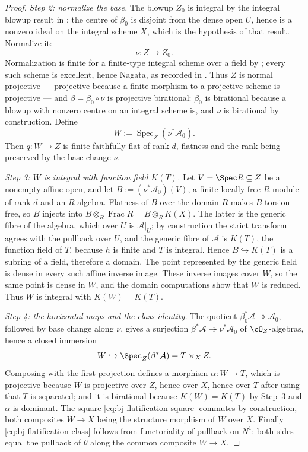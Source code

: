\begin{proof}
\emph{Step 2: normalize the base.}
The blowup $Z_0$ is integral by the integral blowup result in
\cite[\href{https://stacks.math.columbia.edu/tag/01OF}{Tag 01OF}]
{stacks-project}; the centre of $\beta_0$ is disjoint from the dense open
$U$, hence is a nonzero ideal on the integral scheme $X$, which is the
hypothesis of that result.  Normalize it:
\[
                         \nu:Z\longrightarrow Z_0.
\]
Normalization is finite for a finite-type integral scheme over a field by
\cite[\href{https://stacks.math.columbia.edu/tag/035S}{Tag 035S}]
{stacks-project}; every such scheme is excellent, hence Nagata, as recorded
in .
Thus $Z$ is normal projective --- projective because a finite morphism to
a projective scheme is projective --- and
$\beta=\beta_0\circ\nu$ is projective birational: $\beta_0$ is birational
because a blowup with nonzero centre on an integral scheme is, and $\nu$
is birational by construction.  Define
\[
                         W:=\operatorname{Spec}_Z(\nu^*\mathcal A_0).
\tag{41.14}\label{eq:bj-flatification-W}
\]
Then $q:W\to Z$ is finite faithfully flat of rank $d$, flatness and the
rank being preserved by the base change $\nu$.

\emph{Step 3: $W$ is integral with function field $K(T)$.}
Let $V=\Spec R\subseteq Z$ be a nonempty affine open, and let
$B:=(\nu^*\mathcal A_0)(V)$, a finite locally free $R$-module of rank $d$ and an
$R$-algebra.  Flatness of $B$ over the domain $R$ makes $B$
torsion free, so $B$ injects into
$B\otimes_R\operatorname{Frac}R=B\otimes_R K(X)$.  The latter is the
generic fibre of the algebra, which over $U$ is $\mathcal A|_U$; by
construction the strict transform agrees with the pullback over $U$, and
the generic fibre of $\mathcal A$ is $K(T)$, the function field of
$T$, because $h$ is finite and $T$ is integral.  Hence
$B\hookrightarrow K(T)$ is a subring of a field, therefore a domain.  The point represented by the generic field is dense in every such
affine inverse image.  These inverse images cover $W$, so the same point
is dense in $W$, and the domain computations show that $W$ is reduced.
Thus $W$ is integral with $K(W)=K(T)$.

\emph{Step 4: the horizontal maps and the class identity.}
The quotient
$\beta_0^*\mathcal A\twoheadrightarrow\mathcal A_0$, followed by base change along
$\nu$, gives a surjection
$\beta^*\mathcal A\twoheadrightarrow\nu^*\mathcal A_0$ of
$\cO_Z$-algebras, hence a
closed immersion
\[
                         W\hookrightarrow \Spec_Z(\beta^*\mathcal A)
                         =T\times_XZ.
\]
Composing with the first projection defines a morphism $\alpha:W\to T$,
which is projective because $W$ is projective over $Z$, hence over
$X$, hence over $T$ after using that $T$ is separated; and it is
birational because $K(W)=K(T)$ by Step~3 and $\alpha$ is dominant.  The
square \eqref{eq:bj-flatification-square} commutes by construction, both
composites $W\to X$ being the structure morphism of $W$ over $X$.
Finally \eqref{eq:bj-flatification-class} follows from functoriality of
pullback on $N^1$: both sides equal the pullback of $\theta$ along the
common composite $W\to X$.
\end{proof}


